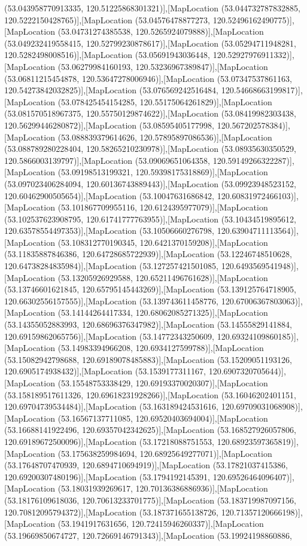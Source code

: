 (53.043958770913335, 120.51225868301321)],[MapLocation (53.044732787832885, 120.5222150428765)],[MapLocation (53.04576478877273, 120.52496162490775)],[MapLocation (53.04731274385538, 120.5265924079888)],[MapLocation (53.049232419558415, 120.52799230878617)],[MapLocation (53.05294711948281, 120.5282498008516)],[MapLocation (53.05691943036448, 120.52927976911332)],[MapLocation (53.06279984160193, 120.53236967389847)],[MapLocation (53.06811215454878, 120.53647278006946)],[MapLocation (53.07347537861163, 120.54273842032825)],[MapLocation (53.076569242516484, 120.54668663199817)],[MapLocation (53.078425454154285, 120.55175064261829)],[MapLocation (53.081570518967375, 120.55750129874622)],[MapLocation (53.08419982303438, 120.56299446280872)],[MapLocation (53.08595405177998, 120.567202578384)],[MapLocation (53.088839379614626, 120.57895897086536)],[MapLocation (53.088789280228404, 120.58265210230978)],[MapLocation (53.08935630350529, 120.5866003139797)],[MapLocation (53.09069651064358, 120.59149266322287)],[MapLocation (53.09198513199321, 120.59398175318869)],[MapLocation (53.097023406284094, 120.60136743889443)],[MapLocation (53.09923948523152, 120.60462900505654)],[MapLocation (53.10047631686842, 120.60831972466103)],[MapLocation (53.101867709955116, 120.6124395977079)],[MapLocation (53.102537623908795, 120.61741777763955)],[MapLocation (53.10434519895612, 120.63578554497353)],[MapLocation (53.10506660276798, 120.63904711113564)],[MapLocation (53.108312770190345, 120.6421370159208)],[MapLocation (53.11835887846386, 120.64728685722939)],[MapLocation (53.12246748510628, 120.64738284835984)],[MapLocation (53.127257421501085, 120.6493569541948)],[MapLocation (53.13205926929588, 120.65211496761628)],[MapLocation (53.13746601621845, 120.65795145443269)],[MapLocation (53.139125764718905, 120.66302556157555)],[MapLocation (53.139743611458776, 120.67006367803063)],[MapLocation (53.14144264417334, 120.68062085271325)],[MapLocation (53.14355052883993, 120.68696376347982)],[MapLocation (53.14555829141884, 120.69159862065756)],[MapLocation (53.14772343250609, 120.69324109860185)],[MapLocation (53.14983394966208, 120.6934127599788)],[MapLocation (53.15082942798688, 120.69189078485883)],[MapLocation (53.15209051193126, 120.6905174938432)],[MapLocation (53.1539177311167, 120.6907320705644)],[MapLocation (53.15548753338429, 120.69193370020307)],[MapLocation (53.158189517611326, 120.69618231928266)],[MapLocation (53.16046202401151, 120.69704739534484)],[MapLocation (53.163189424531616, 120.69709031068908)],[MapLocation (53.16567137711085, 120.69520403694004)],[MapLocation (53.16688141922496, 120.69357042342625)],[MapLocation (53.168527926057806, 120.69189672500096)],[MapLocation (53.17218088751553, 120.68923597365819)],[MapLocation (53.175638259984694, 120.68925649277071)],[MapLocation (53.17648707470939, 120.6894710694919)],[MapLocation (53.17821037415386, 120.69200307480196)],[MapLocation (53.1794192145391, 120.69526464096407)],[MapLocation (53.18031939269617, 120.70136386886936)],[MapLocation (53.18176109618036, 120.70613233701775)],[MapLocation (53.183719987097156, 120.70812095794372)],[MapLocation (53.187371655138726, 120.71357120666198)],[MapLocation (53.1941917631656, 120.72415946260337)],[MapLocation (53.19669850674727, 120.72669146791343)],[MapLocation (53.19924198860886, 